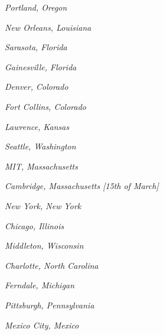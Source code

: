 \emph{Portland, Oregon}

\emph{New Orleans, Louisiana}

\emph{Sarasota, Florida}

\emph{Gainesville, Florida}

\emph{Denver, Colorado}

\emph{Fort Collins, Colorado}

\emph{Lawrence, Kansas}

\emph{Seattle, Washington}

\emph{MIT, Massachusetts}

\emph{Cambridge, Massachusetts {[}15th of March{]}}

\emph{New York, New York}

\emph{Chicago, Illinois}

\emph{Middleton, Wisconsin}

\emph{Charlotte, North Carolina}

\emph{Ferndale, Michigan}

\emph{Pittsburgh, Pennsylvania}

\emph{Mexico City, Mexico}
